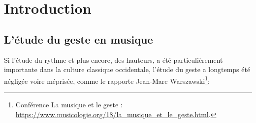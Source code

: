 \section{Introduction}

\subsection{L'étude du geste en musique}

\noindent Si l'étude du rythme et plus encore, des hauteurs, a été particulièrement importante dans la culture classique occidentale, l'étude du geste a longtemps été négligée voire méprisée, comme le rapporte Jean-Marc Warszawski\footnote{Conférence La musique et le geste : \url{https://www.musicologie.org/18/la_musique_et_le_geste.html}.}:


